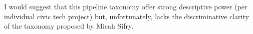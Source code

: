 \color{blue}
  I would suggest that this pipeline taxonomy offer strong descriptive power (per individual civic tech project) but, unfortunately, lacks the discriminative clarity of the taxonomy proposed by Micah Sifry.
\color{darkgray}  